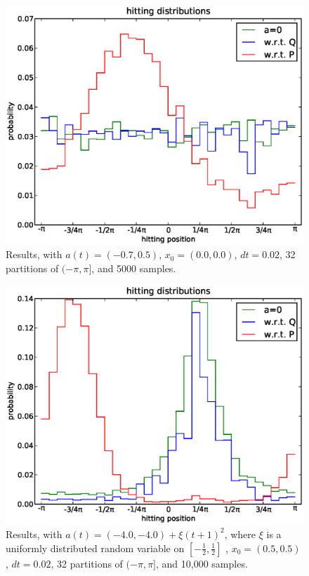 \documentclass[12pt]{article}
\begin{document}
\begin{figure}[h]
\begin{center}
\includegraphics[width=5in]{figure1.eps}
\end{center}
\caption{Results, with $a(t) = (-0.7, 0.5 )$, $x_0 = (0.0, 0.0)$, $dt=0.02$, 32 partitions of $(-\pi,\pi]$, and 5000 samples.}
\end{figure}


\begin{figure}[h]
\begin{center}
\includegraphics[width=5in]{figure2.eps}
\end{center}
\caption{Results, with $a(t) = (-4.0,-4.0) + \xi (t+1)^2$, where $\xi$ is a uniformly distributed random variable on $[-\frac{1}{2},\frac{1}{2}]$ , $x_0 = (0.5, 0.5)$, $dt=0.02$, 32 partitions of $(-\pi,\pi]$, and 10,000 samples.}
\end{figure}
\end{document}
